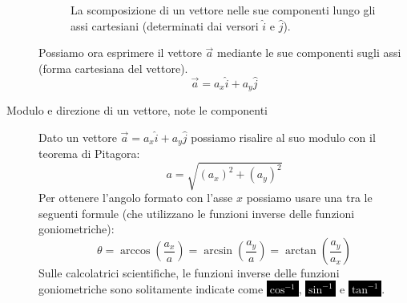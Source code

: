 \documentclass[a4paper,11pt,italian]{article}
\begin{document}
\begin{description}
    \begin{figure}[htb]\centering
    \caption{La scomposizione di un vettore nelle sue componenti lungo gli assi cartesiani (determinati dai versori $ \hat{i} $ e $ \hat{j} $).}
    \end{figure}
  
  
  Possiamo ora esprimere il vettore $ \vec{a} $ mediante le sue componenti sugli assi (forma cartesiana del vettore).
  \[ \vec{a} = a_x \hat{i} + a_y \hat{j} \]
  
  \item[Modulo e direzione di un vettore, note le componenti]
  Dato un vettore $ \vec{a} = a_x \hat{i} + a_y \hat{j}  $ possiamo risalire al suo modulo con il teorema di Pitagora:
  \[ a = \sqrt{(a_x)^2 + (a_y)^2} \]
  Per ottenere l'angolo  formato con l'asse $ x $ possiamo usare una tra le seguenti formule (che utilizzano le funzioni inverse delle funzioni goniometriche):
  \[ \theta  = \arccos\left( \frac{a_x}{a} \right) = \arcsin\left( \frac{a_y}{a} \right) = \arctan\left( \frac{a_y}{a_x} \right) \]
  Sulle calcolatrici scientifiche, le funzioni inverse delle funzioni goniometriche sono solitamente indicate come \colorbox{black}{\textcolor{white}{$ \cos^{-1} $}}, \colorbox{black}{\textcolor{white}{$ \sin^{-1} $}} e \colorbox{black}{\textcolor{white}{$ \tan^{-1} $}}.
\end{description}
\end{document}
